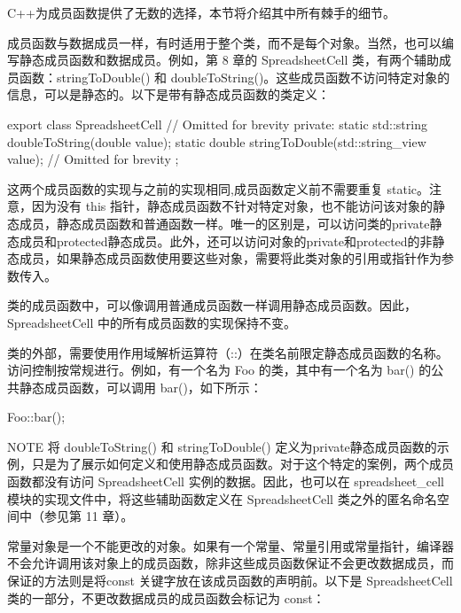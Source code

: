 
C++为成员函数提供了无数的选择，本节将介绍其中所有棘手的细节。


成员函数与数据成员一样，有时适用于整个类，而不是每个对象。当然，也可以编写静态成员函数和数据成员。例如，第 8 章的 SpreadsheetCell 类，有两个辅助成员函数：stringToDouble() 和 doubleToString()。这些成员函数不访问特定对象的信息，可以是静态的。以下是带有静态成员函数的类定义：

\begin{cpp}
export class SpreadsheetCell
{
    // Omitted for brevity
    private:
        static std::string doubleToString(double value);
        static double stringToDouble(std::string_view value);
        // Omitted for brevity
};
\end{cpp}

这两个成员函数的实现与之前的实现相同,成员函数定义前不需要重复 static。注意，因为没有 this 指针，静态成员函数不针对特定对象，也不能访问该对象的静态成员，静态成员函数和普通函数一样。唯一的区别是，可以访问类的private静态成员和protected静态成员。此外，还可以访问对象的private和protected的非静态成员，如果静态成员函数使用要这些对象，需要将此类对象的引用或指针作为参数传入。

类的成员函数中，可以像调用普通成员函数一样调用静态成员函数。因此，SpreadsheetCell 中的所有成员函数的实现保持不变。

类的外部，需要使用作用域解析运算符（::）在类名前限定静态成员函数的名称。访问控制按常规进行。例如，有一个名为 Foo 的类，其中有一个名为 bar() 的公共静态成员函数，可以调用 bar()，如下所示：

\begin{cpp}
Foo::bar();
\end{cpp}

\begin{myNotic}{NOTE}
将 doubleToString() 和 stringToDouble() 定义为private静态成员函数的示例，只是为了展示如何定义和使用静态成员函数。对于这个特定的案例，两个成员函数都没有访问 SpreadsheetCell 实例的数据。因此，也可以在 spreadsheet\_cell 模块的实现文件中，将这些辅助函数定义在 SpreadsheetCell 类之外的匿名命名空间中（参见第 11 章）。
\end{myNotic}


常量对象是一个不能更改的对象。如果有一个常量、常量引用或常量指针，编译器不会允许调用该对象上的成员函数，除非这些成员函数保证不会更改数据成员，而保证的方法则是将const 关键字放在该成员函数的声明前。以下是 SpreadsheetCell 类的一部分，不更改数据成员的成员函数会标记为 const：

